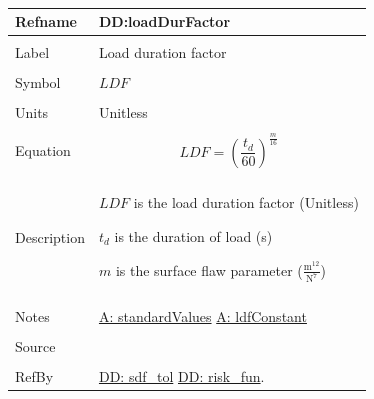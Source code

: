 \documentclass[12pt]{article}
\begin{document}
~\newline
\noindent \begin{minipage}{\textwidth}
\begin{tabular}{p{} p{}}
\toprule \textbf{Refname} & \textbf{DD:loadDurFactor}
\label{DD:loadDurFactor}
\\ \midrule \\
Label & Load duration factor
\\ \midrule \\
Symbol & $LDF$
\\ \midrule \\
Units & Unitless
\\ \midrule \\
Equation & \begin{dmath}
           LDF=\left(\frac{{t_{d}}}{60}\right)^{\frac{m}{16}}
           \end{dmath}
\\ \midrule \\
Description & \begin{symbDescription}
              \item{$LDF$ is the load duration factor (Unitless)}
              \item{${t_{d}}$ is the duration of load (s)}
              \item{$m$ is the surface flaw parameter ($\frac{\text{m}^{12}}{\text{N}^{7}}$)}
              \end{symbDescription}
\\ \midrule \\
Notes & \hyperref[A:standardValues]{A: standardValues}
        \hyperref[A:ldfConstant]{A: ldfConstant}
\\ \midrule \\
Source & \cite{astm2009}
\\ \midrule \\
RefBy & \hyperref[DD:sdf.tol]{DD: sdf\_tol} \hyperref[DD:risk.fun]{DD: risk\_fun}.
\\ \bottomrule \end{tabular}
\end{minipage}\\
~\newline
\end{document}

